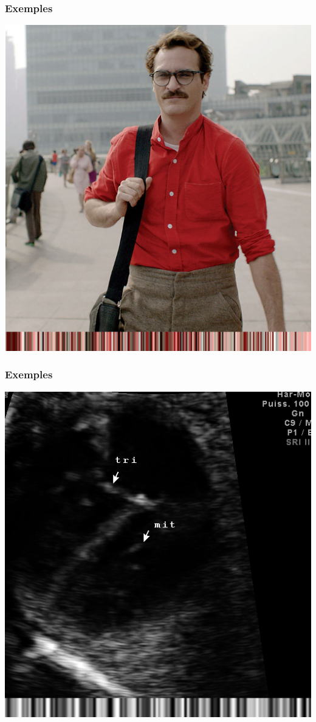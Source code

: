 \documentclass{beamer}
\begin{document}
\begin{frame}
  \frametitle{Exemples}
  \begin{center}
    \includegraphics[scale=0.37]{her.png}
  \end{center}
\end{frame}
\begin{frame}
  \frametitle{Exemples}
  \begin{center}
    \includegraphics[scale=0.37]{bnw.png}
  \end{center}
\end{frame}
\end{document}
